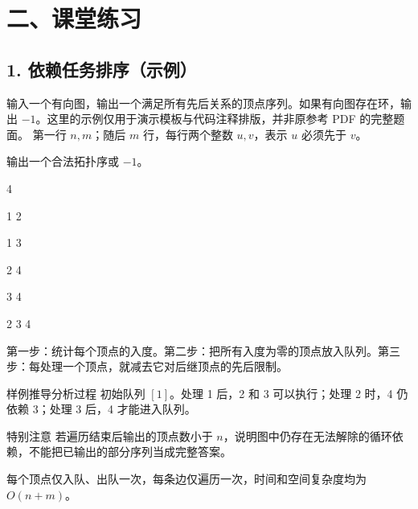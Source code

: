 \documentclass[UTF8,11pt]{ctexart}
\begin{document}
\section{二、课堂练习}
\subsection{1. 依赖任务排序（示例）}
输入一个有向图，输出一个满足所有先后关系的顶点序列。如果有向图存在环，输出 $-1$。这里的示例仅用于演示模板与代码注释排版，并非原参考 PDF 的完整题面。
第一行 $n,m$；随后 $m$ 行，每行两个整数 $u,v$，表示 $u$ 必须先于 $v$。\par
{}
输出一个合法拓扑序或 $-1$。
\LessonInputOutputStart
\begin{lessoninput}
{\ttfamily\small{} 4\par 1 2\par 1 3\par 2 4\par 3 4\par}
\end{lessoninput}
\begin{lessonoutput}
{\ttfamily\small{} 2 3 4\par}
\end{lessonoutput}
\LessonInputOutputEnd
{}
第一步：统计每个顶点的入度。第二步：把所有入度为零的顶点放入队列。第三步：每处理一个顶点，就减去它对后继顶点的先后限制。
\begin{lessonorange}{样例推导分析过程}
初始队列 $[1]$。处理 1 后，2 和 3 可以执行；处理 2 时，4 仍依赖 3；处理 3 后，4 才能进入队列。
\end{lessonorange}
\begin{lessonred}{特别注意}
若遍历结束后输出的顶点数小于 $n$，说明图中仍存在无法解除的循环依赖，不能把已输出的部分序列当成完整答案。
\end{lessonred}
每个顶点仅入队、出队一次，每条边仅遍历一次，时间和空间复杂度均为 $O(n+m)$。
\end{document}
